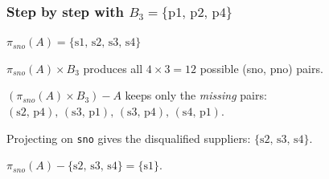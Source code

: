 \documentclass[../../dis.tex]{subfiles}
\begin{document}
\subsubsection*{Step by step with $B_3 = \{\text{p1, p2, p4}\}$}
\begin{dashlist}
    \item $\pi_{\textit{sno}}(A) = \{\text{s1, s2, s3, s4}\}$
    \item $\pi_{\textit{sno}}(A) \times B_3$ produces all $4 \times 3 = 12$ possible (sno, pno) pairs.
    \item $(\pi_{\textit{sno}}(A) \times B_3) - A$ keeps only the \emph{missing} pairs: $(\text{s2, p4}),\, (\text{s3, p1}),\, (\text{s3, p4}),\, (\text{s4, p1})$.
    \item Projecting on \texttt{sno} gives the disqualified suppliers: $\{\text{s2, s3, s4}\}$.
    \item $\pi_{\textit{sno}}(A) - \{\text{s2, s3, s4}\} = \{\text{s1}\}$.
\end{dashlist}
\end{document}
